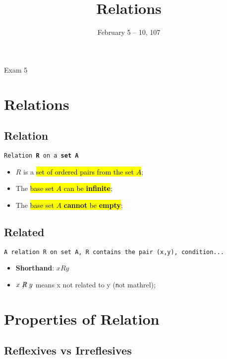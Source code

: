 \documentclass{note}
\date{February 5 -- 10, 107}
\title{Relations}
\begin{document}
    \begin{note}{Exam 5}

        \section{Relations}

        \subsection{Relation}

        \begin{center}
            \texttt{Relation \textbf{R} on a \textbf{set A}}
        \end{center}
        \begin{itemize}
            \item $ R $ is a \hl{set of ordered pairs from the set $ A $};
        \end{itemize}
        \begin{itemize}
            \item The \hl{base set $ A $ can be \textbf{infinite}};
            \item The \hl{base set $ A $ \textbf{cannot} be \textbf{empty}};
        \end{itemize}

        \subsection{Related}

        \begin{center}
            \texttt{A relation R on set A, R contains the pair (x,y), condition...}
        \end{center}
        \begin{itemize}
            \item \textbf{Shorthand}: $ x R y $
            \item $ x \not \mathrel{R} y $ means x not related to y ({\texttt not mathrel});
        \end{itemize}

        \section{Properties of Relation}

        \subsection{Reflexives vs Irreflesives}


\end{note}
\end{document}
